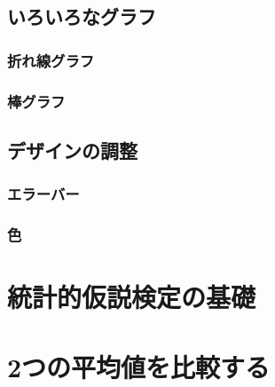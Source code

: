 \documentclass[
]{book}
\begin{document}
\hypertarget{ux3044ux308dux3044ux308dux306aux30b0ux30e9ux30d5}{%
\section{いろいろなグラフ}\label{ux3044ux308dux3044ux308dux306aux30b0ux30e9ux30d5}}

\hypertarget{ux6298ux308cux7ddaux30b0ux30e9ux30d5}{%
\subsection{折れ線グラフ}\label{ux6298ux308cux7ddaux30b0ux30e9ux30d5}}

\hypertarget{ux68d2ux30b0ux30e9ux30d5}{%
\subsection{棒グラフ}\label{ux68d2ux30b0ux30e9ux30d5}}

\hypertarget{ux30c7ux30b6ux30a4ux30f3ux306eux8abfux6574}{%
\section{デザインの調整}\label{ux30c7ux30b6ux30a4ux30f3ux306eux8abfux6574}}

\hypertarget{ux30a8ux30e9ux30fcux30d0ux30fc}{%
\subsection{エラーバー}\label{ux30a8ux30e9ux30fcux30d0ux30fc}}

\hypertarget{ux8272}{%
\subsection{色}\label{ux8272}}

\hypertarget{ux7d71ux8a08ux7684ux4eeeux8aacux691cux5b9aux306eux57faux790e}{%
\chapter{統計的仮説検定の基礎}\label{ux7d71ux8a08ux7684ux4eeeux8aacux691cux5b9aux306eux57faux790e}}

\hypertarget{ux3064ux306eux5e73ux5747ux5024ux3092ux6bd4ux8f03ux3059ux308b}{%
\chapter{2つの平均値を比較する}\label{ux3064ux306eux5e73ux5747ux5024ux3092ux6bd4ux8f03ux3059ux308b}}
\end{document}
